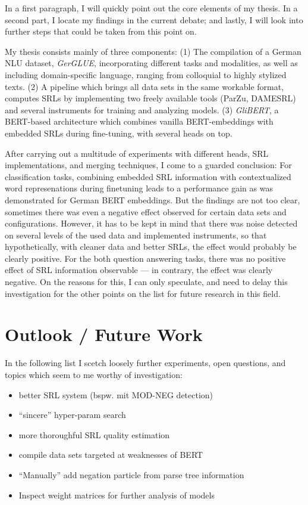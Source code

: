 \label{chap:6_conclusion}


In a first paragraph, I will quickly point out the core elements of my thesis. In a second part, I
locate my findings in the current debate; and lastly, I will look into further steps that could be
taken from this point on.

My thesis consists mainly of three components: (1) The compilation of a German NLU
dataset, \emph{GerGLUE}, incorporating different tasks and modalities, as well as
including domain-specific language, ranging from colloquial to highly stylized texts.
(2) A pipeline which brings all data sets in the same workable format, computes SRLs
by implementing two freely available tools (ParZu, DAMESRL) and several instruments
for training and analyzing models. (3) \emph{GliBERT}, a BERT-based architecture
which combines vanilla BERT-embeddings with embedded SRLs during fine-tuning, with
several heads on top.

After carrying out a multitude of experiments with different heads, SRL implementations,
and merging techniques, I come to a guarded conclusion: For classification tasks, combining
embedded SRL information with contextualized word represenations during finetuning leads to
a performance gain as was demonstrated for German BERT embeddings. But the findings are not
too clear, sometimes there was even a negative effect observed for certain data sets and
configurations. However, it has to be kept in mind that there was noise detected on several
levels of the used data and implemented instruments, so that hypothetically, with cleaner
data and better SRLs, the effect would probably be clearly positive. For the both question
answering tasks, there was no positive effect of SRL information observable --- in contrary,
the effect was clearly negative. On the reasons for this, I can only speculate, and need
to delay this investigation for the other points on the list for future research in this field.



\section{Outlook / Future Work}

In the following list I scetch loosely further experiments, open questions, and topics which
seem to me worthy of investigation:

\begin{itemize}
  \item better SRL system (bspw. mit MOD-NEG detection)
  \item ``sincere'' hyper-param search
  \item more thoroughful SRL quality estimation
  \item compile data sets targeted at weaknesses of BERT
  \item ``Manually'' add negation particle from parse tree information
  \item Inspect weight matrices for further analysis of models
\end{itemize}


